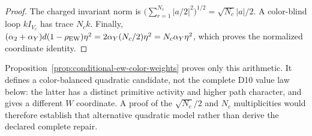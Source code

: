\documentclass[11pt]{article}
\begin{document}
\begin{proof}
The charged invariant norm is
\(\bigl(\sum_{r=1}^{N_c}|a/2|^2\bigr)^{1/2}
=\sqrt{N_c}|a|/2\).  A color-blind loop \(kI_{V_c}\) has trace \(N_ck\).
Finally,
\((\alpha_2+\alpha_Y)d(1-\rho_{\rm EW})\eta^2
=2\alpha_Y(N_c/2)\eta^2=N_c\alpha_Y\eta^2\), which proves the normalized
coordinate identity.
\end{proof}

Proposition~\ref{prop:conditional-ew-color-weights} proves only this
arithmetic. It defines a color-balanced quadratic candidate,
not the complete D10 value law below: the latter has a distinct primitive
activity and higher path character, and gives a different \(W\) coordinate.
A proof of the \(\sqrt{N_c}/2\) and \(N_c\) multiplicities would therefore
establish that alternative quadratic model rather than derive the declared
complete repair.
\end{document}
